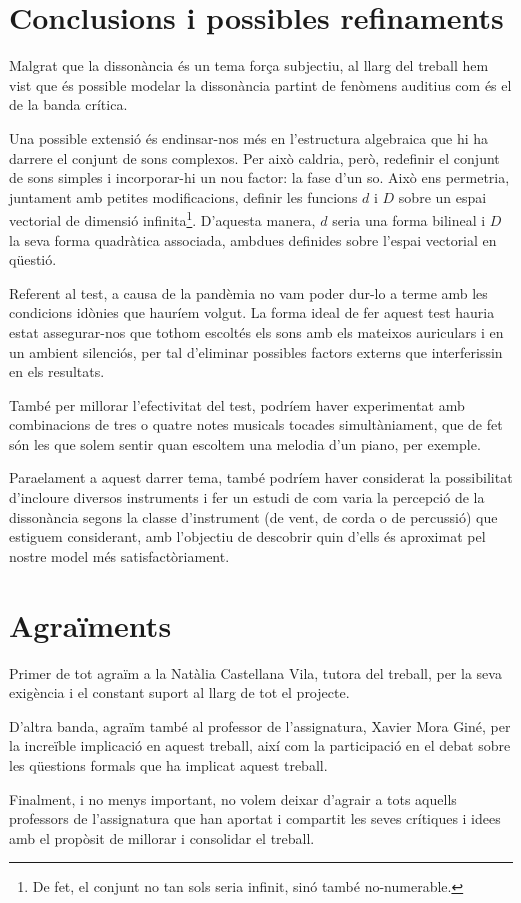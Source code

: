 \documentclass{article}
\theoremstyle{math}
\theoremstyle{TheoremNum}
\newcommand{\0}{\ensuremath{\vb{0}}}
\begin{document}
\section{Conclusions i possibles refinaments}
Malgrat que la dissonància és un tema força subjectiu, al llarg del treball hem vist que és possible modelar la dissonància partint de fenòmens auditius com és el de la banda crítica.\par
Una possible extensió és endinsar-nos més en l'estructura algebraica que hi ha darrere el conjunt de sons complexos. Per això caldria, però, redefinir el conjunt de sons simples i incorporar-hi un nou factor: la fase d'un so. Això ens permetria, juntament amb petites modificacions, definir les funcions $d$ i $D$ sobre un espai vectorial de dimensió infinita\footnote{De fet, el conjunt no tan sols seria infinit, sinó també no-numerable.}. D'aquesta manera, $d$ seria una forma bilineal i $D$ la seva forma quadràtica associada, ambdues definides sobre l'espai vectorial en qüestió.\par
Referent al test, a causa de la pandèmia no vam poder dur-lo a terme amb les condicions idònies que hauríem volgut. La forma ideal de fer aquest test hauria estat assegurar-nos que tothom escoltés els sons amb els mateixos auriculars i en un ambient silenciós, per tal d'eliminar possibles factors externs que interferissin en els resultats.\par
També per millorar l'efectivitat del test, podríem haver experimentat amb combinacions de tres o quatre notes musicals tocades simultàniament, que de fet són les que solem sentir quan escoltem una melodia d'un piano, per exemple. \par Para\lgem elament a aquest darrer tema, també podríem haver considerat la possibilitat d'incloure diversos instruments i fer un estudi de com varia la percepció de la dissonància segons la classe d'instrument (de vent, de corda o de percussió) que estiguem considerant, amb l'objectiu de descobrir quin d'ells és aproximat pel nostre model més satisfactòriament.
\section{Agraïments}
Primer de tot agraïm a la Natàlia Castellana Vila, tutora del treball, per la seva exigència i el constant suport al llarg de tot el projecte. \par
D'altra banda, agraïm també al professor de l'assignatura, Xavier Mora Giné, per la increïble implicació en aquest treball, així com la participació en el debat sobre les qüestions formals que ha implicat aquest treball.\par 
Finalment, i no menys important, no volem deixar d'agrair a tots aquells professors de l'assignatura que han aportat i compartit les seves crítiques i idees amb el propòsit de millorar i consolidar el treball.
\printbibliography[heading=bibintoc]
\appendix
\end{document}
